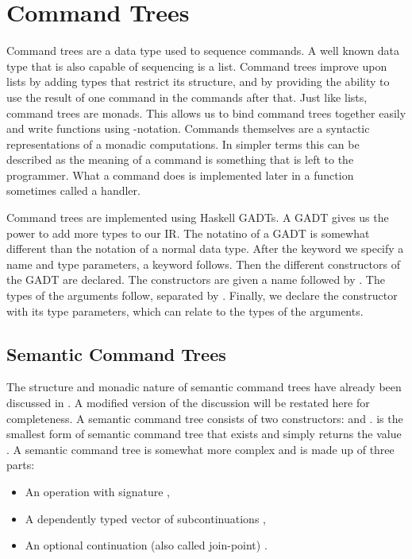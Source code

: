 \section{\label{section:commandtree}Command Trees}
Command trees are a data type used to sequence commands. A well known data type that is also capable of sequencing is a list. Command trees improve upon lists by adding types that restrict its structure, and by providing the ability to use the result of one command in the commands after that. Just like lists, command trees are monads. This allows us to bind command trees together easily and write functions using -notation. Commands themselves are a syntactic representations of a monadic computations. In simpler terms this can be described as the meaning of a command is something that is left to the programmer. What a command does is implemented later in a function sometimes called a handler.

Command trees are implemented using Haskell \acp{GADT}. A \ac{GADT} gives us the power to add more types to our \ac{IR}. The notatino of a \ac{GADT} is somewhat different than the notation of a normal data type. After the  keyword we specify a name and type parameters, a  keyword follows. Then the different constructors of the \ac{GADT} are declared. The constructors are given a name followed by \icode{::}. The types of the arguments follow, separated by \icode{->}. Finally, we declare the constructor with its type parameters, which can relate to the types of the arguments.

\subsection{\label{subsection:semantree}Semantic Command Trees}
The structure and monadic nature of semantic command trees have already been discussed in  \autocite{commandtreespoulsen}. A modified version of the discussion will be restated here for completeness. A semantic command tree consists of two constructors:  and .  is the smallest form of semantic command tree that exists and simply returns the value . A  semantic command tree is somewhat more complex and is made up of three parts:

\begin{itemize}
\item An operation  with signature ,
\item A dependently typed vector of subcontinuations ,
\item An optional continuation (also called join-point) .
\end{itemize}

